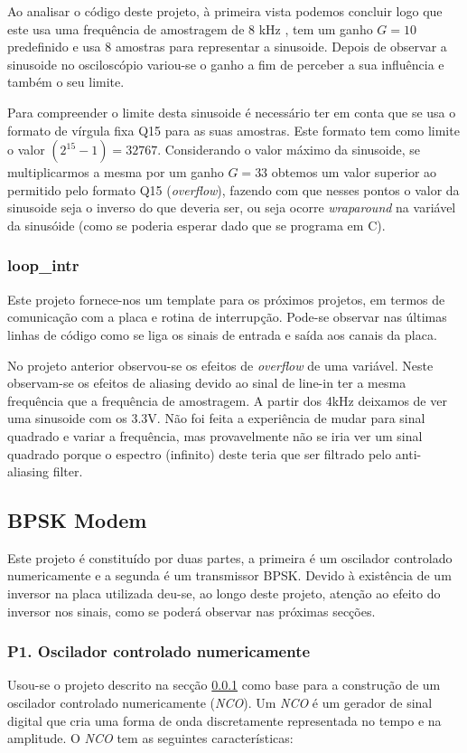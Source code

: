 \documentclass[11pt]{article}
\numberwithin{equation}{section}
\begin{document}
	Ao analisar o código deste projeto, à primeira vista podemos concluir logo que este usa uma frequência de amostragem de 8 kHz , tem um ganho $G=10$ predefinido e usa 8 amostras para representar a sinusoide. Depois de observar a sinusoide no osciloscópio variou-se o ganho a fim de perceber a sua influência e também o seu limite.
	
	Para compreender o limite desta sinusoide é necessário ter em conta que se usa o formato de vírgula fixa Q15 para as suas amostras. Este formato tem como limite o valor $(2^{15}-1) = 32767$. Considerando o valor máximo da sinusoide, se multiplicarmos a mesma por um ganho $G=33$ obtemos um valor superior ao permitido pelo formato Q15 (\textit{overflow}), fazendo com que nesses pontos o valor da sinusoide seja o inverso do que deveria ser, ou seja ocorre \textit{wraparound} na variável da sinusóide (como se poderia esperar dado que se programa em C).   
	
	\subsubsection{loop\_intr}
	\label{sec:loop}
	Este projeto fornece-nos um template para os próximos projetos, em termos de comunicação com a placa e rotina de interrupção. Pode-se observar nas últimas linhas de código como se liga os sinais de entrada e saída aos canais da placa.
	
	No projeto anterior observou-se os efeitos de \textit{overflow} de uma variável. Neste observam-se os efeitos de aliasing  devido ao sinal de line-in ter a mesma frequência que a frequência de amostragem. A partir dos 4kHz deixamos de ver uma sinusoide com os 3.3V. Não foi feita a experiência de mudar para sinal quadrado e variar a frequência, mas provavelmente não se iria ver um sinal quadrado porque o espectro (infinito) deste teria que ser filtrado pelo anti-aliasing filter. 
	
	\subsection{BPSK Modem}
	Este projeto é constituído por duas partes, a primeira é um oscilador controlado numericamente e a segunda é um transmissor BPSK. Devido à existência de um inversor na placa utilizada deu-se, ao longo deste projeto, atenção ao efeito do inversor nos sinais, como se poderá observar nas próximas secções.
	
	\subsubsection{P1. Oscilador controlado numericamente}
	\label{NCO}
	Usou-se o projeto descrito na secção \ref{sec:loop} como base para a construção de um oscilador controlado numericamente (\textit{NCO}). Um \textit{NCO} é um gerador de sinal digital que cria uma forma de onda discretamente representada no tempo e na amplitude. O \textit{NCO} tem as seguintes características:
	
\end{document}
